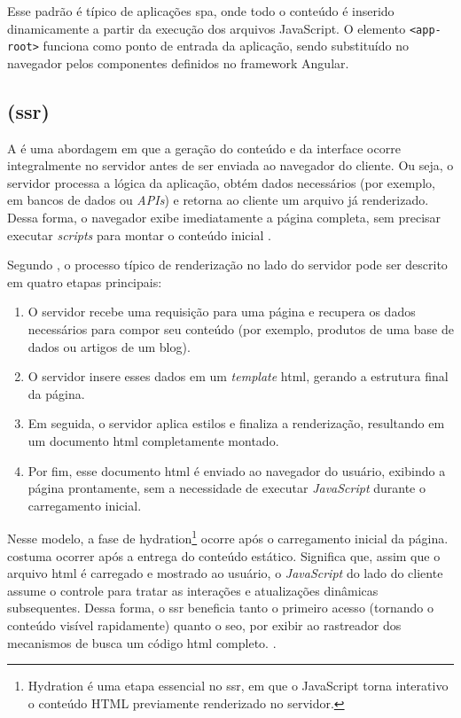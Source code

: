 Esse padrão é típico de aplicações \acrshort{spa}, onde todo o conteúdo é inserido dinamicamente a partir da execução dos arquivos JavaScript. O elemento \texttt{<app-root>} funciona como ponto de entrada da aplicação, sendo substituído no navegador pelos componentes definidos no framework Angular. {\cite{atori2024}}


\subsection{ (\acrshort{ssr})}
\label{subsec:ssr}

A \textbf{} é uma abordagem em que a geração do conteúdo e da interface ocorre integralmente no servidor antes de ser enviada ao navegador do cliente. Ou seja, o servidor processa a lógica da aplicação, obtém dados necessários (por exemplo, em bancos de dados ou \emph{APIs}) e retorna ao cliente um arquivo  já renderizado. Dessa forma, o navegador exibe imediatamente a página completa, sem precisar executar \emph{scripts} para montar o conteúdo inicial \cite{atori2024}. 

Segundo , o processo típico de renderização no lado do servidor pode ser descrito em quatro etapas principais:

\begin{enumerate}
    \item O servidor recebe uma requisição para uma página e recupera os dados necessários para compor seu conteúdo (por exemplo, produtos de uma base de dados ou artigos de um blog).
    \item O servidor insere esses dados em um \emph{template} \acrshort{html}, gerando a estrutura final da página.
    \item Em seguida, o servidor aplica estilos e finaliza a renderização, resultando em um documento \acrshort{html} completamente montado.
    \item Por fim, esse documento \acrshort{html} é enviado ao navegador do usuário, exibindo a página prontamente, sem a necessidade de executar \emph{JavaScript} durante o carregamento inicial.
\end{enumerate}

Nesse modelo, a fase de hydration\footnote{Hydration é uma etapa essencial no \acrshort{ssr}, em que o JavaScript torna interativo o conteúdo HTML previamente renderizado no servidor.} ocorre após o carregamento inicial da página. costuma ocorrer após a entrega do conteúdo estático. Significa que, assim que o arquivo \acrshort{html} é carregado e mostrado ao usuário, o \emph{JavaScript} do lado do cliente assume o controle para tratar as interações e atualizações dinâmicas subsequentes. Dessa forma, o \acrshort{ssr} beneficia tanto o primeiro acesso (tornando o conteúdo visível rapidamente) quanto o \acrshort{seo}, por exibir ao rastreador dos mecanismos de busca um código \acrshort{html} completo. \cite{atori2024}.

